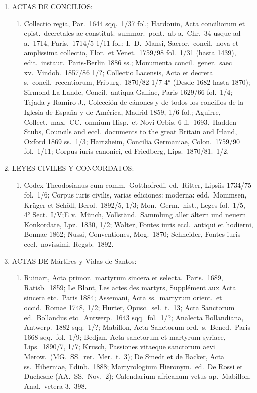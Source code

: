\raggedbottom{} \documentclass[12pt, a4paper]{book}
\begin{document}
\begin{enumerate}
\begin{enumerate}
        \end{enumerate}
  \item ACTAS DE CONCILIOS:\@  \begin{enumerate}
          \item Collectio regia, Par.\ 1644 sqq.\ 1/37 fol.; Hardouin, Acta conciliorum et epist.\ decretales ac constitut.\ summor.\ pont.\ ab a.\ Chr.\ 34 usque ad a.\ 1714, Paris.\ 1714/5 1/11 fol.; I.\ D.\ Mansi, Sacror.\ concil.\ nova et amplissima collectio, Flor.\ et Venet.\ 1759/98 fol.\ 1/31 (hasta 1439), edit.\ instaur.\ Paris-Berlin 1886 ss.; Monumenta concil.\ gener.\ saec xv.\ Vindob.\ 1857/86 1/?; Collectio Lacensis, Acta et decreta s.\ concil.\ recentiorum, Friburg.\ 1870/82 1/7 4° (Desde 1682 hasta 1870); Sirmond-La-Lande, Concil.\ antiqua Galliae, Paris 1629/66 fol.\ 1/4; Tejada y Ramiro J., Colección de cánones y de todos los concilios de la Iglesia de España y de América, Madrid 1859, 1/6 fol.; Aguirre, Collect.\ max.\ CC.\ omnium Hisp.\ et Novi Orbis, 6 fl.\ 1693.\ Hadden-Stubs, Councils and eccl.\ documents to the great Britain and Irland, Oxford 1869 ss.\ 1/3; Hartzheim, Concilia Germaniae, Colon.\ 1759/90 fol.\ 1/11; Corpus iuris canonici, ed Friedberg, Lips.\ 1870/81.\ 1/2.
        \end{enumerate}
  \item LEYES CIVILES Y CONCORDATOS:\@  \begin{enumerate}
          \item Codex Theodosianus cum comm.\ Gotthofredi, ed.\ Ritter, Lipsiis 1734/75 fol.\ 1/6; Corpus iuris civilis, varias ediciones: moderna: edd.\ Mommsen, Krüger et Schöll, Berol.\ 1892/5, 1/3; Mon.\ Germ.\ hist., Leges fol.\ 1/5, 4° Sect.\ I/V;\@ E v.\ Münch, Vollständ.\ Sammlung aller ältern und neuern Konkordate, Lpz.\ 1830, 1/2; Walter, Fontes iuris eccl.\ antiqui et hodierni, Bonnae 1862; Nussi, Conventiones, Mog.\ 1870; Schneider, Fontes iuris eccl.\ novissimi, Regsb.\ 1892.
        \end{enumerate}
  \item ACTAS DE Mártires y Vidas de Santos:  \begin{enumerate}
          \item Ruinart, Acta primor.\ martyrum sincera et selecta.\ Paris.\ 1689, Ratisb.\ 1859; Le Blant, Les actes des martyrs, Supplément aux Acta sincera etc.\ Paris 1884; Assemani, Acta ss.\ martyrum orient.\ et occid.\ Romae 1748, 1/2; Hurter, Opusc.\ sel.\ t.\ 13; Acta Sanctorum ed.\ Bollandus etc.\ Antwerp.\ 1643 sqq.\ fol.\ 1/?; Analecta Bollandiana, Antwerp.\ 1882 sqq.\ 1/?; Mabillon, Acta Sanctorum ord.\ s.\ Bened.\ Paris 1668 sqq.\ fol.\ 1/9; Bedjan, Acta sanctorum et martyrum syriace, Lips.\ 1890/7, 1/7; Krusch, Passiones vitaeque sanctorum aevi Merow.\ (MG.\ SS.\ rer.\ Mer.\ t.\ 3); De Smedt et de Backer, Acta ss.\ Hiberniae, Edinb.\ 1888; Martyrologium Hieronym.\ ed.\ De Rossi et Duchesne (AA.\ SS.\ Nov.\ 2); Calendarium africanum vetus ap.\ Mabillon, Anal.\ vetera 3.\ 398.

\end{enumerate}
\end{enumerate}
\end{document}
